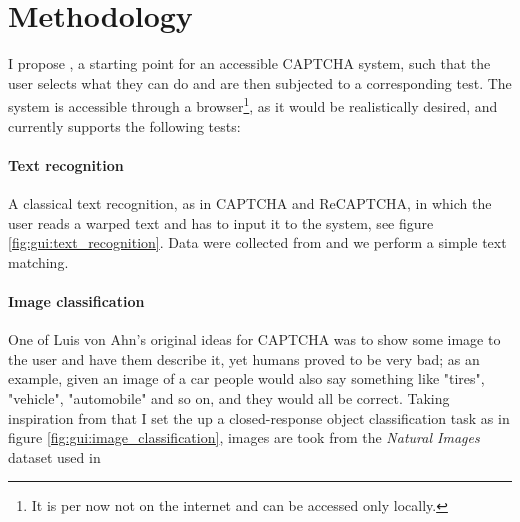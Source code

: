 \section{Methodology}
I propose \name, a starting point for an accessible CAPTCHA system, such that the user selects what they can do and are then subjected to a corresponding test.
The system is accessible through a browser\footnote{It is per now not on the internet and can be accessed only locally.}, as it would be realistically desired, and currently supports the following tests:

\paragraph{Text recognition}
A classical text recognition, as in CAPTCHA and ReCAPTCHA, in which the user reads a warped text and has to input it to the system, see figure \ref{fig:gui:text_recognition}.
Data were collected from \cite{wilhemy2013dataset,gregwar2022captcha} and we perform a simple text matching.

\paragraph{Image classification}
One of Luis von Ahn's original ideas for CAPTCHA was to show some image to the user and have them describe it, yet humans proved to be very bad; as an example, given an image of a car people would also say something like "tires", "vehicle", "automobile" and so on, and they would all be correct.
Taking inspiration from that I set the up a closed-response object classification task as in figure \ref{fig:gui:image_classification}, images are took from the \emph{Natural Images} dataset used in \cite{roy2018deep}

